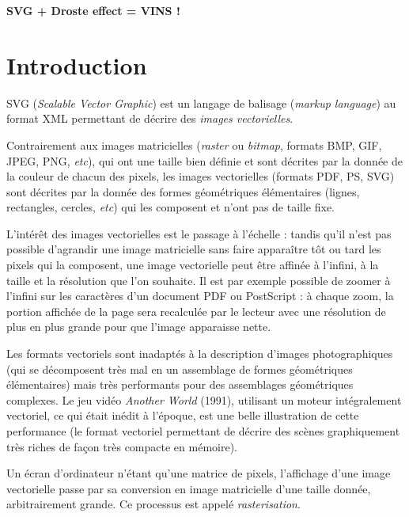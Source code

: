 \documentclass[10pt, a4paper]{article}
\author{}
\title{}
\date{\today}
\begin{document}
\renewcommand{\labelitemi}{\textbullet}  %

\renewcommand{\leq}{\leqslant}              %
\renewcommand{\geq}{\geqslant}              %


\begin{center}\Huge
\textbf{SVG + Droste effect = VINS !}
\end{center}

\section{Introduction}

SVG (\emph{Scalable Vector Graphic}) est un langage de balisage (\emph{markup language}) au format XML
permettant de décrire des \emph{images vectorielles}.

Contrairement
aux images matricielles (\emph{raster} ou \emph{bitmap}, formats BMP,
GIF, JPEG, PNG, \textit{etc}), qui ont une
taille bien définie et sont décrites par la donnée de la couleur de
chacun des pixels, les images vectorielles (formats PDF, PS, SVG) sont décrites par la
donnée des formes géométriques élémentaires (lignes, rectangles,
cercles, \textit{etc}) qui les composent et n'ont pas de taille fixe.

L'intérêt
des images vectorielles est le passage à l'échelle : tandis qu'il
n'est pas possible d'agrandir une image matricielle sans faire
apparaître tôt ou tard les pixels qui la composent, une image
vectorielle peut être affinée à l'infini, à la taille et la résolution
que l'on souhaite. Il est par exemple possible de zoomer à l'infini
sur les caractères d'un document PDF ou PostScript : à chaque zoom,
la portion affichée de la page sera recalculée par le lecteur avec une
résolution de plus en plus grande pour que l'image apparaisse nette.

Les formats vectoriels sont inadaptés à la description d'images
photographiques (qui se décomposent très mal en un assemblage de formes
géométriques élémentaires) mais très performants pour des assemblages
géométriques complexes. Le jeu vidéo \emph{Another World} (1991), utilisant
un moteur intégralement vectoriel, ce qui était inédit à l'époque, est
une belle illustration de cette performance (le format vectoriel
permettant de décrire des scènes graphiquement très riches de façon
très compacte en mémoire).

Un écran d'ordinateur n'étant qu'une matrice de pixels, l'affichage
d'une image vectorielle passe par sa conversion en image matricielle
d'une taille donnée, arbitrairement grande. Ce processus est appelé \emph{rasterisation}.
\end{document}
